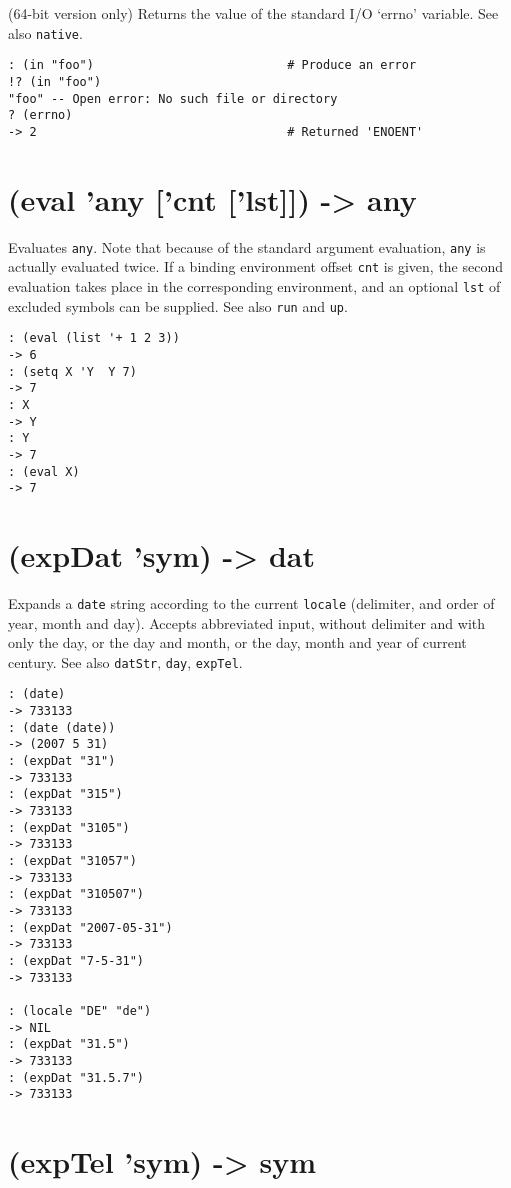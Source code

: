 {{{{{(64-bit version only) Returns the value of the standard I/O `errno'
variable. See also \texttt{native}.


\begin{verbatim}
: (in "foo")                           # Produce an error
!? (in "foo")
"foo" -- Open error: No such file or directory
? (errno)
-> 2                                   # Returned 'ENOENT'
\end{verbatim}

 
\section{(eval 'any ['cnt ['lst]]) -> any}
\label{sec-8-1-5-13}


Evaluates \texttt{any}. Note that because of the standard argument evaluation,
\texttt{any} is actually evaluated twice. If a binding environment offset \texttt{cnt}
is given, the second evaluation takes place in the corresponding
environment, and an optional \texttt{lst} of excluded symbols can be supplied.
See also \texttt{run} and \texttt{up}.


\begin{verbatim}
: (eval (list '+ 1 2 3))
-> 6
: (setq X 'Y  Y 7)
-> 7
: X
-> Y
: Y
-> 7
: (eval X)
-> 7
\end{verbatim}

 
\section{(expDat 'sym) -> dat}
\label{sec-8-1-5-14}


Expands a \texttt{date} string according to the current \texttt{locale} (delimiter,
and order of year, month and day). Accepts abbreviated input, without
delimiter and with only the day, or the day and month, or the day, month
and year of current century. See also \texttt{datStr}, \texttt{day}, \texttt{expTel}.


\begin{verbatim}
: (date)
-> 733133
: (date (date))
-> (2007 5 31)
: (expDat "31")
-> 733133
: (expDat "315")
-> 733133
: (expDat "3105")
-> 733133
: (expDat "31057")
-> 733133
: (expDat "310507")
-> 733133
: (expDat "2007-05-31")
-> 733133
: (expDat "7-5-31")
-> 733133

: (locale "DE" "de")
-> NIL
: (expDat "31.5")
-> 733133
: (expDat "31.5.7")
-> 733133
\end{verbatim}

 
\section{(expTel 'sym) -> sym}
\label{sec-8-1-5-15}


}}}}}
